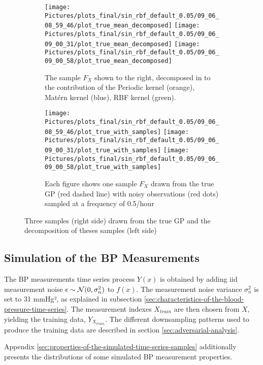 \begin{figure}[!htb]
\centering
\begin{subfigure}{.45\textwidth}
    \centering
    \texttt{[image: Pictures/plots\_final/sin\_rbf\_default\_0.05/09\_06\_08\_59\_46/plot\_true\_mean\_decomposed]}
    \texttt{[image: Pictures/plots\_final/sin\_rbf\_default\_0.05/09\_06\_09\_00\_31/plot\_true\_mean\_decomposed]}
    \texttt{[image: Pictures/plots\_final/sin\_rbf\_default\_0.05/09\_06\_09\_00\_58/plot\_true\_mean\_decomposed]}
  \caption{The sample $F_X$ shown to the right, decomposed in to the contribution of the Periodic kernel (orange),
      Matérn kernel (blue), RBF kernel (green).}
  \label{fig:true_mean_decomposed}
\end{subfigure}\hfill
\begin{subfigure}{.45\textwidth}
    \centering
    \texttt{[image: Pictures/plots\_final/sin\_rbf\_default\_0.05/09\_06\_08\_59\_46/plot\_true\_with\_samples]}
    \texttt{[image: Pictures/plots\_final/sin\_rbf\_default\_0.05/09\_06\_09\_00\_31/plot\_true\_with\_samples]}
    \texttt{[image: Pictures/plots\_final/sin\_rbf\_default\_0.05/09\_06\_09\_00\_58/plot\_true\_with\_samples]}
  \caption{Each figure shows one sample $F_X$ drawn from the true GP (red dashed line) with noisy observations
      (red dots) sampled at a frequency of 0.5/hour}
  \label{fig:sub2}
\end{subfigure}
\caption{Three samples (right side) drawn from the true GP and the decomposition of theses samples (left side)}
\label{fig:true_gp_samples}
\end{figure}


\subsection{Simulation of the BP Measurements}\label{subsec:simulation-of-the-bp-measurements}

The BP measurements time series process $Y(x)$ is obtained by adding iid measurement noise
$\epsilon \sim \operatorname{\mathcal{N}}(0, \sigma_n^2)$ to $f(x)$.
The measurement noise variance
$\sigma_n^2$ is set to 31 mmHg², as explained in subsection
\ref{sec:characteristics-of-the-blood-pressure-time-series}.
The measurement indexes $X_{train}$ are then chosen
from $X$, yielding the training data, $Y_{X_{train}}$.
The different downsampling patterns used to produce the training data
are described in section \ref{sec:adversarial-analysis}.

Appendix \ref{sec:properties-of-the-simulated-time-series-samples} additionally presents
the distributions of some simulated BP measurement properties.


